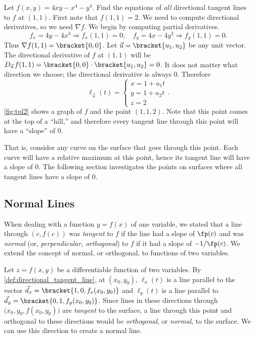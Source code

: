 \begin{example}\label{ex_tpl2}
Let $f(x,y) = 4xy-x^4-y^4$. Find the equations of \emph{all} directional tangent lines to $f$ at $(1,1)$.
\solution
First note that $f(1,1) = 2$. We need to compute directional derivatives, so we need $\nabla f$. We begin by computing partial derivatives.
\[
f_x = 4y-4x^3 \Rightarrow f_x(1,1) = 0;\quad f_y = 4x-4y^3\Rightarrow f_y(1,1) = 0.
\]
Thus $\nabla f(1,1) =\bracket{0,0}$. Let $\vec u =\bracket{u_1,u_2}$ be any unit vector. The directional derivative of $f$ at $(1,1)$ will be $D_{\vec u\,}f(1,1) =\bracket{0,0}\cdot\bracket{u_1,u_2}= 0$. It does not matter what direction we choose; the directional derivative is always 0. Therefore
%
%
\[
\ell_{\vec u}(t) = \begin{cases}x= 1 +u_1t\\ y = 1+ u_2 t\\ z= 2\end{cases}.
\]
\autoref{fig:tpl2} shows a graph of $f$ and the point $(1,1,2)$. Note that this point comes at the top of a ``hill,'' and therefore every tangent line through this point will have a ``slope'' of 0. 

That is, consider any curve on the surface that goes through this point. Each curve will have a relative maximum at this point, hence its tangent line will have a slope of 0. The following section investigates the points on surfaces where all tangent lines have a slope of 0.
\end{example}

\subsection{Normal Lines}

When dealing with a function $y=f(x)$ of one variable, we stated that a line through $(c,f(c))$ was \emph{tangent} to $f$ if the line had a slope of $\fp(c)$ and was \emph{normal} (or, \emph{perpendicular, orthogonal}) to $f$ if it had a slope of $-1/\fp(c)$. We extend the concept of normal, or orthogonal, to functions of two variables. 

Let $z=f(x,y)$ be a differentiable function of two variables. By \autoref{def:directional_tangent_line}, at $(x_0,y_0)$, $\ell_x(t)$ is a line parallel to the vector $\vec d_x=\bracket{1,0,f_x(x_0,y_0)}$ and $\ell_y(t)$ is a line parallel to $\vec d_y=\bracket{0,1,f_y(x_0,y_0)}$. Since lines in these directions through $\bigl(x_0,y_0,f(x_0,y_0)\bigr)$ are \emph{tangent} to the surface, a line through this point and orthogonal to these directions would be \emph{orthogonal}, or \emph{normal}, to the surface. We can use this direction to create a normal line.

